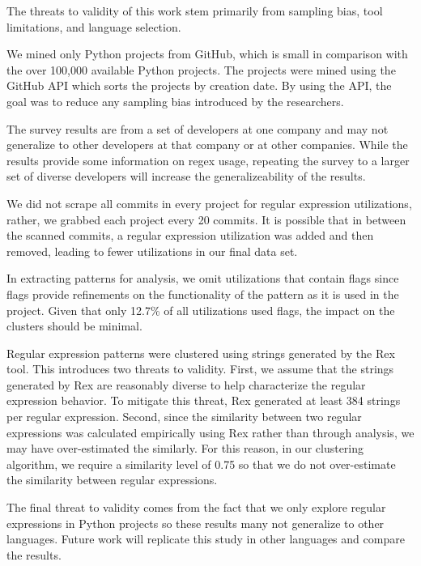 \documentclass{sig-alternate}
\newcommand{\todoMid}[1]{}%
\begin{document}
\todoMid{organize by internal, external, conclusion, construct}

The threats to validity of this work stem primarily from sampling bias, tool limitations, and language selection.

We mined only  Python projects from GitHub, which is  small in comparison with the over 100,000 available Python projects. The projects were mined using the GitHub API which sorts the projects by creation date. By using the API, the goal was to reduce any sampling bias introduced by the researchers.

The survey results are from a set of developers at one company and may not generalize to other developers at that company or at other companies. While the results provide some information on regex usage, repeating the survey to a larger set of diverse developers will increase the generalizeability of the results.

We did not scrape all commits in every project for regular expression utilizations, rather, we grabbed each project every 20 commits. It is possible that in between the scanned commits, a regular expression utilization was added and then removed, leading to fewer utilizations in our final data set.

In extracting patterns for analysis, we omit utilizations that contain flags since flags provide refinements on the functionality of the pattern as it is used in the project. Given that only 12.7\% of all utilizations used flags, the impact on the clusters should be minimal.


Regular expression patterns were clustered using strings generated by the Rex tool. This introduces two threats to validity. First, we assume that the strings generated by Rex are reasonably diverse to help characterize the regular expression behavior. To mitigate this threat, Rex generated at least 384 strings per regular expression. Second, since the similarity between two regular expressions was calculated empirically using Rex rather than through analysis, we may have over-estimated the similarly. For this reason, in our clustering algorithm, we require a similarity level of 0.75 so that we do not over-estimate the similarity between regular  expressions.

The final threat to validity comes from the fact that we only explore regular expressions in Python projects so these results many not generalize to other languages. Future work will replicate this study in other languages and compare the results.
\end{document}

